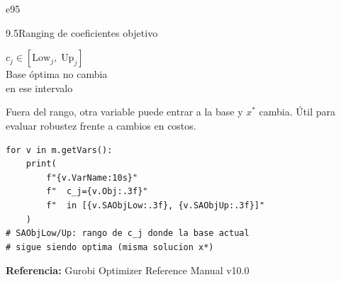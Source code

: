 \documentclass[10pt,a4paper]{article}
\newlength{\mathcolw}
\newlength{\codecolw}
\newcommand{\entryheader}[2][]{%
  \needspace{5cm}%
  \vspace{6pt}%
  \ifx\relax#1\relax\else\phantomsection\hypertarget{#1}{}\fi%
  \noindent%
  \begin{tcolorbox}[
    colback=subsecbg!18,
    colframe=subsecbg!45,
    sharp corners, boxrule=0.4pt,
    left=5pt, right=5pt, top=2pt, bottom=2pt,
    fontupper=\small\bfseries\sffamily,
  ]
  #2
  \end{tcolorbox}%
  \vspace{2pt}%
}
\begin{document}
\vspace{4pt}

\entryheader[e95]{9.5\quad Ranging de coeficientes objetivo}
\noindent
\begin{minipage}[t]{\mathcolw}
    \begin{tcolorbox}[mathbox]
        $c_j \in [\text{Low}_j,\;\text{Up}_j]$\\[6pt]
        Base \'optima no cambia\\ en ese intervalo
    \end{tcolorbox}
    \vspace{2pt}
    \begin{tcolorbox}[notebox]
        Fuera del rango, otra variable puede entrar a la base y $x^*$ cambia. \'Util para evaluar robustez frente a cambios en costos.
    \end{tcolorbox}
\end{minipage}\hspace{0.02\textwidth}%
\begin{minipage}[t]{\codecolw}
    \begin{lstlisting}[style=gurobipy]
for v in m.getVars():
    print(
        f"{v.VarName:10s}"
        f"  c_j={v.Obj:.3f}"
        f"  in [{v.SAObjLow:.3f}, {v.SAObjUp:.3f}]"
    )
# SAObjLow/Up: rango de c_j donde la base actual
# sigue siendo optima (misma solucion x*)
    \end{lstlisting}
\end{minipage}

\vspace{14pt}

\begin{tcolorbox}[
        colback=sectionbg!8, colframe=sectionbg!30,
        sharp corners, boxrule=0.4pt,
        left=8pt, right=8pt, top=4pt, bottom=4pt,
    ]
    \footnotesize
    \textbf{Referencia:} Gurobi Optimizer Reference Manual v10.0\enspace
\end{tcolorbox}
\end{document}
